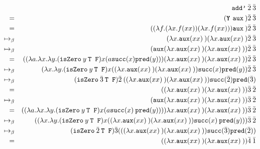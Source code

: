 \documentclass[11pt]{article}
\begin{document}
\begin{enumerate}
		\begin{align*}
		&& \texttt{add'} \: \bar{2} \: \bar{3} &\\
		= && (\textbf{\texttt{Y} } \texttt{aux} \: ) \bar{2} \: \bar{3} &\\
		= && (( \lambda f. ( \lambda x. f(xx))( \lambda x. f(xx))) \texttt{aux} \: ) \bar{2} \: \bar{3} &\\
		\mapsto_\beta && ( \lambda x. \texttt{aux}(x x) \:)( \lambda x. \texttt{aux}(x x) \:) \bar{2} \: \bar{3} &\\
		\mapsto_\beta && (\texttt{aux}( \lambda x. \texttt{aux}(x x) \:)( \lambda x. \texttt{aux}(x x) \:)) \bar{2} \: \bar{3} &\\
		= && (( \lambda a. \lambda x. \lambda y. ( \texttt{isZero} \: y \: \texttt{T F}) x ( a \texttt{succ}(x) \texttt{pred}(y)))( \lambda x. \texttt{aux}(x x) \:)( \lambda x. \texttt{aux}(x x) \:)) \bar{2} \: \bar{3} &\\
		\mapsto_\beta && ( \lambda x. \lambda y. ( \texttt{isZero} \: y \: \texttt{T F}) x (( \lambda x. \texttt{aux}(x x) \:)( \lambda x. \texttt{aux}(x x) \:)) \texttt{succ}(x) \texttt{pred}(y)) \bar{2} \: \bar{3} &\\
		\mapsto_\beta && ( \texttt{isZero} \: \bar{3} \: \texttt{T F}) \bar{2} \: (( \lambda x. \texttt{aux}(x x) \:)( \lambda x. \texttt{aux}(x x) \:)) \texttt{succ}( \bar{2} ) \texttt{pred}( \bar{3} ) &\\
		= && (( \lambda x. \texttt{aux}(x x) \:)( \lambda x. \texttt{aux}(x x) \:)) \bar{3} \: \bar{2} &\\
		\mapsto_\beta && ( \texttt{aux}( \lambda x. \texttt{aux}(x x) \:)( \lambda x. \texttt{aux}(x x) \:)) \bar{3} \: \bar{2} &\\
		= && (( \lambda a. \lambda x. \lambda y. ( \texttt{isZero} \: y \: \texttt{T F}) x (a \texttt{succ}(x) \: \texttt{pred}(y)))) \lambda x. \texttt{aux}(x x) \:)( \lambda x. \texttt{aux}(x x) \:)) \bar{3} \: \bar{2} &\\
		\mapsto_\beta && (( \lambda x. \lambda y. ( \texttt{isZero} \: y \: \texttt{T F}) x (( \lambda x. \texttt{aux}(x x) \:)( \lambda x. \texttt{aux}(x x) \:)) \texttt{succ}(x)	\: \texttt{pred}(y))) \bar{3} \: \bar{2} &\\
		\mapsto_\beta && ( \texttt{isZero} \: \bar{2} \: \texttt{T F}) \bar{3} ((( \lambda x. \texttt{aux}(x x) \:)( \lambda x. \texttt{aux}(x x) \:)) \texttt{succ}( \bar{3} )	\texttt{pred}( \bar{2} )) &\\
		= && (( \lambda x. \texttt{aux}(x x) \:)( \lambda x. \texttt{aux}(x x) \:)) \bar{4} \: \bar{1} &\\

\end{align*}
\end{enumerate}
\end{document}
